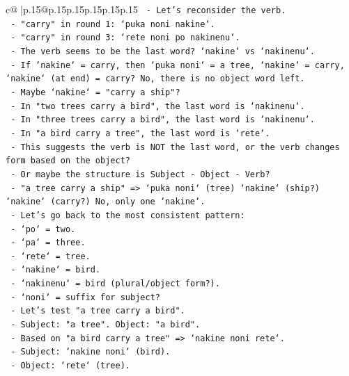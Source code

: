 \documentclass{article}
\begin{document}
{\begin{supertabular}{c@{$\;$}|p{.15\linewidth}@{}p{.15\linewidth}p{.15\linewidth}p{.15\linewidth}p{.15\linewidth}p{.15\linewidth}}
{{{\texttt{        {-} Let's reconsider the verb.} \\
\texttt{        {-} "carry" in round 1: `puka noni nakine`.} \\
\texttt{        {-} "carry" in round 3: `rete noni po nakinenu`.} \\
\texttt{        {-} The verb seems to be the last word? `nakine` vs `nakinenu`.} \\
\texttt{        {-} If `nakine` = carry, then `puka noni` = a tree, `nakine` = carry, `nakine` (at end) = carry? No, there is no object word left.} \\
\texttt{        {-} Maybe `nakine` = "carry a ship"?} \\
\texttt{        {-} In "two trees carry a bird", the last word is `nakinenu`.} \\
\texttt{        {-} In "three trees carry a bird", the last word is `nakinenu`.} \\
\texttt{        {-} In "a bird carry a tree", the last word is `rete`.} \\
\texttt{        {-} This suggests the verb is NOT the last word, or the verb changes form based on the object?} \\
\texttt{        {-} Or maybe the structure is Subject {-} Object {-} Verb?} \\
\texttt{        {-} "a tree carry a ship" => `puka noni` (tree) `nakine` (ship?) `nakine` (carry?) No, only one `nakine`.} \\
\texttt{        {-} Let's go back to the most consistent pattern:} \\
\texttt{        {-} `po` = two.} \\
\texttt{        {-} `pa` = three.} \\
\texttt{        {-} `rete` = tree.} \\
\texttt{        {-} `nakine` = bird.} \\
\texttt{        {-} `nakinenu` = bird (plural/object form?).} \\
\texttt{        {-} `noni` = suffix for subject?} \\
\texttt{        {-} Let's test "a tree carry a bird".} \\
\texttt{        {-} Subject: "a tree". Object: "a bird".} \\
\texttt{        {-} Based on "a bird carry a tree" => `nakine noni rete`.} \\
\texttt{          {-} Subject: `nakine noni` (bird).} \\
\texttt{          {-} Object: `rete` (tree).} \\
}}}
\end{supertabular}}
\end{document}
